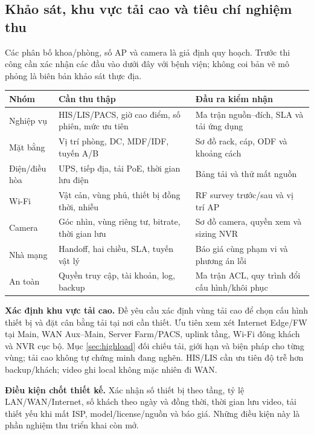 \documentclass[
  11pt,
]{article}
\begin{document}
\clearpage
\subsection{Khảo sát, khu vực tải cao và tiêu chí nghiệm thu}
Các phân bố khoa/phòng, số AP và camera là giả định quy hoạch. Trước thi công cần xác nhận các đầu vào dưới đây với bệnh viện; không coi bản vẽ mô phỏng là biên bản khảo sát thực địa.
\par\noindent
{}
\begin{tabularx}{\linewidth}{@{}p{.19\linewidth}XX@{}}\toprule
Nhóm & Cần thu thập & Đầu ra kiểm nhận\\\midrule
Nghiệp vụ & HIS/LIS/PACS, giờ cao điểm, số phiên, mức ưu tiên & Ma trận nguồn--đích, SLA và tải ứng dụng\\
Mặt bằng & Vị trí phòng, DC, MDF/IDF, tuyến A/B & Sơ đồ rack, cáp, ODF và khoảng cách\\
Điện/điều hòa & UPS, tiếp địa, tải PoE, thời gian lưu điện & Bảng tải và thử mất nguồn\\
Wi-Fi & Vật cản, vùng phủ, thiết bị đồng thời, nhiễu & RF survey trước/sau và vị trí AP\\
Camera & Góc nhìn, vùng riêng tư, bitrate, thời gian lưu & Sơ đồ camera, quyền xem và sizing NVR\\
Nhà mạng & Handoff, hai chiều, SLA, tuyến vật lý & Báo giá cùng phạm vi và phương án lỗi\\
An toàn & Quyền truy cập, tài khoản, log, backup & Ma trận ACL, quy trình đổi cấu hình/khôi phục\\\bottomrule\end{tabularx}\par

\textbf{Xác định khu vực tải cao.} Đề yêu cầu xác định vùng tải cao để chọn cấu hình thiết bị và đặt cân bằng tải tại nơi cần thiết. Ưu tiên xem xét Internet Edge/FW tại Main, WAN Aux--Main, Server Farm/PACS, uplink tầng, Wi-Fi đông khách và NVR cục bộ. Mục \ref{sec:highload} đối chiếu tải, giới hạn và biện pháp cho từng vùng; tải cao không tự chứng minh đang nghẽn. HIS/LIS cần ưu tiên độ trễ hơn backup/khách; video ghi local không mặc nhiên đi WAN.

\textbf{Điều kiện chốt thiết kế.} Xác nhận số thiết bị theo tầng, tỷ lệ LAN/WAN/Internet, số khách theo ngày và đồng thời, thời gian lưu video, tải thiết yếu khi mất ISP, model/license/nguồn và báo giá. Những điều kiện này là phần nghiệm thu triển khai còn mở.
\end{document}
